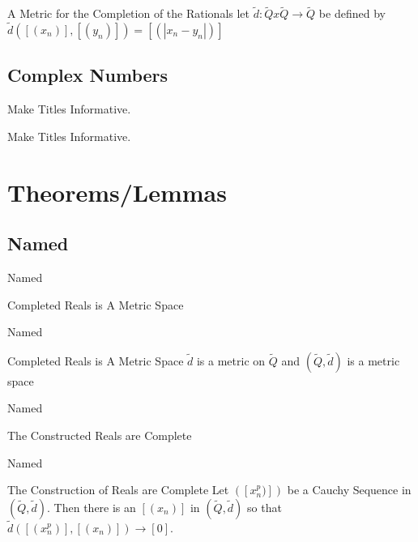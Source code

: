 \documentclass{beamer}
\begin{document}
\begin{frame}
	\begin{block}{A Metric for the Completion of the Rationals}
		let $\tilde{d}: \tilde{Q}x\tilde{Q} \rightarrow \tilde{Q} $ be defined by $\tilde{d}([(x_n)],[(y_n)]) = [(|x_n - y_n|)]$ 
	\end{block}
\end{frame}

\subsection{Complex Numbers}

\begin{frame}{Make Titles Informative.}
\end{frame}

\begin{frame}{Make Titles Informative.}
\end{frame}



\section{Theorems/Lemmas}

\subsection{Named}

\begin{frame}{Named}
	\begin{block}{Completed Reals is A Metric Space}
	\end{block}
\end{frame}

\begin{frame}{Named}
        \begin{block}{Completed Reals is A Metric Space}
		$\tilde{d}$ is a metric on $\tilde{Q}$ and $(\tilde{Q},\tilde{d})$ is a metric space
	\end{block}
\end{frame}

\begin{frame}{Named}
	\begin{block}{The Constructed Reals are Complete}
	\end{block}
\end{frame}

\begin{frame}{Named}
        \begin{block}{The Construction of Reals are Complete}
		Let $([x_n^p)])$ be a Cauchy Sequence in $(\tilde{Q},\tilde{d})$. Then there is an $[(x_n)]$ in $(\tilde{Q},\tilde{d})$ so that $\tilde{d}([(x_n^p)],[(x_n)]) \rightarrow [0]$. 
        \end{block}
\end{frame}
\end{document}
